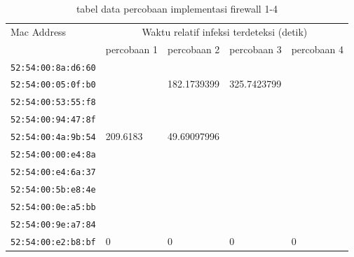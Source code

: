 \begin{table}[H]
	\caption{tabel data percobaan implementasi firewall 1-4}
	\label{table:data percobaan implementasi firewall 1_4}
	\centering
	\footnotesize
	\begin{tabular}{|l|l|l|l|l|}
		\hline
		\multirow{2}{*}{Mac Address} & \multicolumn{4}{c|}{Waktu relatif infeksi terdeteksi (detik)} \\ \cline{2-5} 
		& percobaan 1 & percobaan 2 & percobaan 3 & percobaan 4\\ \hline
		\footnotesize{\verb|52:54:00:8a:d6:60|} &  &  &  & \\ \hline
		\footnotesize{\verb|52:54:00:05:0f:b0|} &  & 182.1739399 & 325.7423799 & \\ \hline
		\footnotesize{\verb|52:54:00:53:55:f8|} &  &  &  & \\ \hline
		\footnotesize{\verb|52:54:00:94:47:8f|} &  &  &  & \\ \hline
		\footnotesize{\verb|52:54:00:4a:9b:54|} & 209.6183 & 49.69097996 &  & \\ \hline
		\footnotesize{\verb|52:54:00:00:e4:8a|} &  &  &  & \\ \hline
		\footnotesize{\verb|52:54:00:e4:6a:37|} &  &  &  & \\ \hline
		\footnotesize{\verb|52:54:00:5b:e8:4e|} &  &  &  & \\ \hline
		\footnotesize{\verb|52:54:00:0e:a5:bb|} &  &  &  & \\ \hline
		\footnotesize{\verb|52:54:00:9e:a7:84|} &  &  &  & \\ \hline
		\footnotesize{\verb|52:54:00:e2:b8:bf|} & 0 & 0 & 0 & 0\\ \hline
	\end{tabular}
\end{table}

